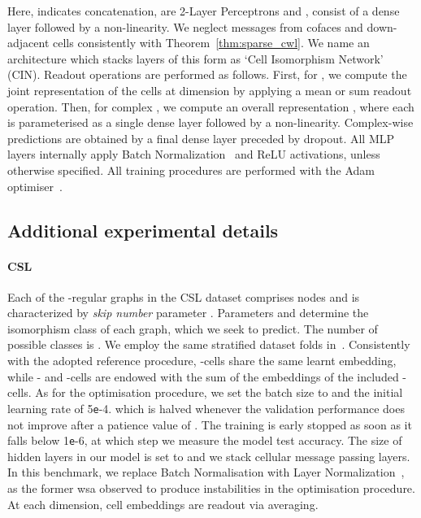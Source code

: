\documentclass{article}
\newcommand{\tte}{\texttt{e}}
\begin{document}
Here,  indicates concatenation,  are 2-Layer Perceptrons and ,  consist of a dense layer followed by a non-linearity. We neglect messages from cofaces and down-adjacent cells consistently with Theorem~\ref{thm:sparse_cwl}. We name an architecture which stacks  layers of this form as `Cell Isomorphism Network' (CIN). Readout operations are performed as follows. First, for , we compute the joint representation  of the cells at dimension  by applying a mean or sum readout operation. Then, for complex , we compute an overall representation , where each  is parameterised as a single dense layer followed by a non-linearity. Complex-wise predictions are obtained by a final dense layer preceded by dropout. All MLP layers internally apply Batch Normalization~\citep{BN} and ReLU activations, unless otherwise specified. All training procedures are performed with the Adam optimiser~\cite{kingma2014adam}.

\subsection{Additional experimental details}

\paragraph{CSL} Each of the  -regular graphs in the CSL dataset comprises  nodes and is characterized by \emph{skip number} parameter . Parameters  and  determine the isomorphism class  of each graph, which we seek to predict. The number of possible classes is . We employ the same stratified dataset folds in~\citet{dwivedi2020benchmarkgnns}. Consistently with the adopted reference procedure, -cells share the same learnt embedding, while - and -cells are endowed with the sum of the embeddings of the included -cells. As for the optimisation procedure, we set the batch size to  and the initial learning rate of 5\tte-4. which is halved whenever the validation performance does not improve after a patience value of . The training is early stopped as soon as it falls below 1\tte-6, at which step we measure the model test accuracy. The size of hidden layers in our model is set to  and we stack  cellular message passing layers. In this benchmark, we replace Batch Normalisation with Layer Normalization~\cite{ba2016layer}, as the former wsa observed to produce instabilities in the optimisation procedure. At each dimension, cell embeddings are readout via averaging.
\end{document}
